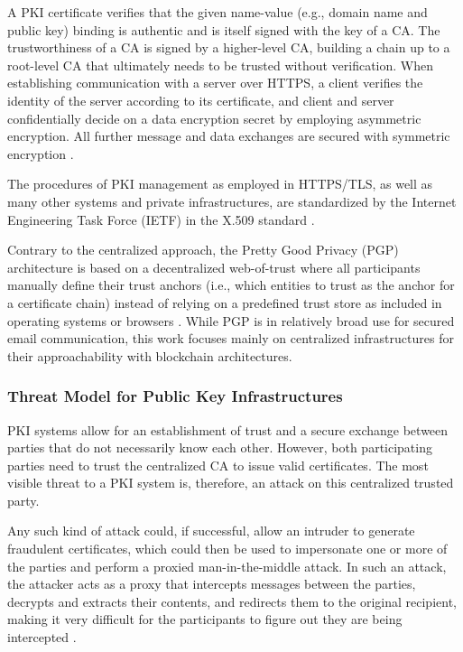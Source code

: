 A PKI certificate verifies that the given name-value (e.g., domain name and public key) binding is authentic and is itself signed with the key of a CA. The trustworthiness of a CA is signed by a higher-level CA, building a chain up to a root-level CA that ultimately needs to be trusted without verification. When establishing communication with a server over HTTPS, a client verifies the identity of the server according to its certificate, and client and server confidentially decide on a data encryption secret by employing asymmetric encryption. All further message and data exchanges are secured with symmetric encryption \cite{straub_tobias_usability_2006}.

The procedures of PKI management as employed in HTTPS/TLS, as well as many other systems and private infrastructures, are standardized by the Internet Engineering Task Force (IETF) in the X.509 standard \cite{adams_internet_2015}.

Contrary to the centralized approach, the Pretty Good Privacy (PGP) architecture is based on a decentralized web-of-trust where all participants manually define their trust anchors (i.e., which entities to trust as the anchor for a certificate chain) instead of relying on a predefined trust store as included in operating systems or browsers \cite{straub_tobias_usability_2006}. While PGP is in relatively broad use for secured email communication, this work focuses mainly on centralized infrastructures for their approachability with blockchain architectures.


\subsubsection{Threat Model for Public Key Infrastructures}
\label{subsubsec:threat_model_pki}

PKI systems allow for an establishment of trust and a secure exchange between parties that do not necessarily know each other. However, both participating parties need to trust the centralized CA to issue valid certificates. The most visible threat to a PKI system is, therefore, an attack on this centralized trusted party.

Any such kind of attack could, if successful, allow an intruder to generate fraudulent certificates, which could then be used to impersonate one or more of the parties and perform a proxied man-in-the-middle attack. In such an attack, the attacker acts as a proxy that intercepts messages between the parties, decrypts and extracts their contents, and redirects them to the original recipient, making it very difficult for the participants to figure out they are being intercepted \cite{zusman_criminal_2008}.


